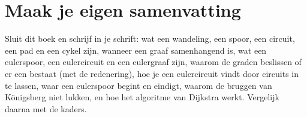 
\ifzelfstudie
\section*{Maak je eigen samenvatting}
Sluit dit boek en schrijf in je schrift: wat een wandeling, een spoor, een circuit, een pad en een cykel zijn, wanneer een graaf samenhangend is, wat een eulerspoor, een eulercircuit en een eulergraaf zijn, waarom de graden beslissen of er een bestaat (met de redenering), hoe je een eulercircuit vindt door circuits in te lassen, waar een eulerspoor begint en eindigt, waarom de bruggen van Königsberg niet lukken, en hoe het algoritme van Dijkstra werkt. Vergelijk daarna met de kaders.
\fi
